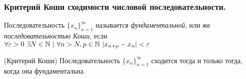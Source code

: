 \subsubsection{Критерий Коши сходимости числовой последовательности.}

\begin{definition}
	Последовательность $\{x_n\}_{n = 1}^\infty$ называется \textit{фундаментальной}, или же \textit{последовательностью Коши}, если $\forall \varepsilon > 0\ \exists N \in \mathbb{N}\ |\ \forall n > N, p \in \mathbb{N}\ |x_{n + p} - x_n| < \varepsilon$
\end{definition}

\begin{theorem} (Критерий Коши)
	Последовательность $\{x_n\}_{n = 1}^\infty$ сходится тогда и только тогда, когда она фундаментальна. 
\end{theorem}

